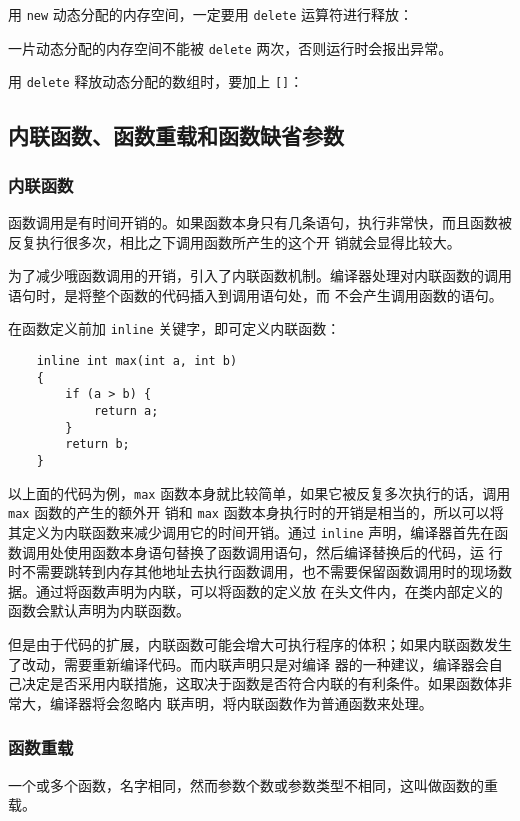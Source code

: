 \documentclass[UTF8]{ctexart}
\begin{document}
用 \texttt{new} 动态分配的内存空间，一定要用 \texttt{delete} 运算符进行释放：

一片动态分配的内存空间不能被 \texttt{delete} 两次，否则运行时会报出异常。

用 \texttt{delete} 释放动态分配的数组时，要加上 \texttt{[]}：

\subsection{内联函数、函数重载和函数缺省参数}
\subsubsection{内联函数}
函数调用是有时间开销的。如果函数本身只有几条语句，执行非常快，而且函数被反复执行很多次，相比之下调用函数所产生的这个开
销就会显得比较大。

为了减少哦函数调用的开销，引入了内联函数机制。编译器处理对内联函数的调用语句时，是将整个函数的代码插入到调用语句处，而
不会产生调用函数的语句。

在函数定义前加 \texttt{inline} 关键字，即可定义内联函数：
\begin{verbatim}
    inline int max(int a, int b)
    {
        if (a > b) {
            return a;
        }
        return b;
    }
\end{verbatim}

以上面的代码为例，\texttt{max} 函数本身就比较简单，如果它被反复多次执行的话，调用 \texttt{max} 函数的产生的额外开
销和 \texttt{max} 函数本身执行时的开销是相当的，所以可以将其定义为内联函数来减少调用它的时间开销。通过
\texttt{inline} 声明，编译器首先在函数调用处使用函数本身语句替换了函数调用语句，然后编译替换后的代码，运
行时不需要跳转到内存其他地址去执行函数调用，也不需要保留函数调用时的现场数据。通过将函数声明为内联，可以将函数的定义放
在头文件内，在类内部定义的函数会默认声明为内联函数。

但是由于代码的扩展，内联函数可能会增大可执行程序的体积；如果内联函数发生了改动，需要重新编译代码。而内联声明只是对编译
器的一种建议，编译器会自己决定是否采用内联措施，这取决于函数是否符合内联的有利条件。如果函数体非常大，编译器将会忽略内
联声明，将内联函数作为普通函数来处理。

\subsubsection{函数重载}
一个或多个函数，名字相同，然而参数个数或参数类型不相同，这叫做函数的重载。
\end{document}
